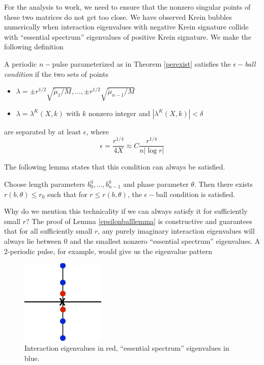 \documentclass[thesis.tex]{subfiles}
\begin{document}
For the analysis to work, we need to ensure that the nonzero singular points of these two matrices do not get too close. We have observed Krein bubbles numerically when interaction eigenvalues with negative Krein signature collide with ``essential spectrum'' eigenvalues of positive Krein signature. We make the following definition

\begin{definition}\label{epsilonballs}
A periodic $n-$pulse parameterized as in Theorem \ref{perexist} satisfies the \emph{$\epsilon-$ball condition} if the two sets of points 
\begin{itemize}
\item $\lambda = \pm r^{1/2} \sqrt{\tilde{\mu}_1/M}, \dots, \pm r^{1/2} \sqrt{\tilde{\mu}_{n-1}/M}$
\item $\lambda = \lambda^K(X,k)$ with $k$ nonzero integer and $|\lambda^K(X,k)| < \delta$
\end{itemize}

are separated by at least $\epsilon$, where
\[
\epsilon = \frac{r^{1/4}}{4X} \approx C \frac{r^{1/4}}{n |\log r| }
\]
\end{definition}

The following lemma states that this condition can always be satisfied.

\begin{lemma}\label{epsilonballlemma}
Choose length parameters $b_0^0, \dots, b_{n-1}^0$ and phase parameter $\theta$. Then there exists $r(b, \theta) \leq r_0$ such that for $r \leq r(b, \theta)$, the $\epsilon-$ball condition is satisfied.
\end{lemma} 

Why do we mention this technicality if we can always satisfy it for sufficiently small $r$? The proof of Lemma \ref{epsilonballlemma} is constructive and guarantees that for all sufficiently small $r$, any purely imaginary interaction eigenvalues will always lie between 0 and the smallest nonzero ``essential spectrum'' eigenvalues. A 2-periodic pulse, for example, would give us the eigenvalue pattern

\begin{figure}[H]
\begin{center}
\includegraphics[width=4cm]{periodic/2pulseess}
\end{center}
\caption{Interaction eigenvalues in red, ``essential spectrum'' eigenvalues in blue.}
\end{figure}
\end{document}
